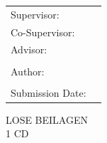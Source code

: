 \begin{titlepage}
  

  \begin{center}
  
  \vspace{30mm}
  {\huge\bfseries \getTitle{}}
  
  
  \end{center}





  \vspace{10mm}

  \vspace{15mm}
  \begin{tabular}{l l}
    
    Supervisor:        & \getSupervisor{} \\
    Co-Supervisor:     & \getCoSupervisor{} \\
    Advisor:           & \getAdvisor{} \\
    				   & \\
    Author:            & \getAuthor{} \\
    				   & \\
    Submission Date:   & \getSubmissionDate{} \\
    
  \end{tabular}

  \begin{center}
  \vspace{20mm}
  {\large\MakeUppercase{Lose Beilagen}}\\
  
  \vspace{5mm}
  {\large\MakeUppercase{1 CD}}\\
  
    \vspace{20mm}
  {\getLegalStatement{}}
  \end{center}

\end{titlepage}
